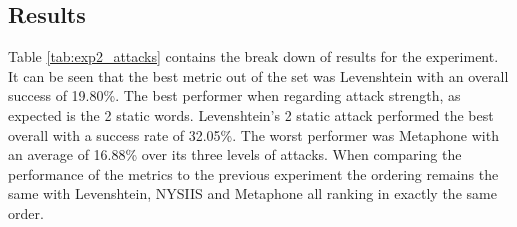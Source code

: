 \subsection*{Results}
Table \ref{tab:exp2_attacks} contains the break down of results for the experiment. It can be seen that the best metric out of the set was Levenshtein with an overall success of 19.80\%. The best performer when regarding attack strength, as expected is the 2 static words. Levenshtein's 2 static attack performed the best overall with a success rate of 32.05\%. The worst performer was Metaphone with an average of 16.88\% over its three levels of attacks. When comparing the performance of the metrics to the previous experiment the ordering remains the same with Levenshtein, NYSIIS and Metaphone all ranking in exactly the same order.

\begin{table}
    \caption{Success rates for simulated attacks}
    \label{tab:exp2_attacks}
\end{table}

